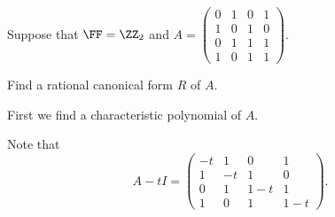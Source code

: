 \documentclass[11pt]{scrartcl}
\begin{document}
  Suppose that $\FF = \ZZ_2$ and $A=
  \begin{pmatrix}
    0 & 1 & 0 & 1\\
    1 & 0 & 1 & 0\\
    0 & 1 & 1 & 1\\
    1 & 0 & 1 & 1
  \end{pmatrix}
$.
\begin{problem*}
  \hfill

Find a rational canonical form $R$ of $A$.

\end{problem*}

\begin{soln}
  \hfill

  First we find a characteristic polynomial of $A$.

  Note that 
  \begin{equation*}
A- tI = 
  \begin{pmatrix}
    -t & 1 & 0 & 1\\
    1 & -t & 1 & 0\\
    0 & 1 & 1-t & 1\\
    1 & 0 & 1 & 1-t
  \end{pmatrix}.
  \end{equation*}


\end{soln}
\end{document}
